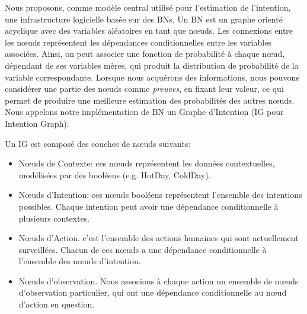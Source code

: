 \documentclass[a4paper,11pt,twoside]{StyleThese}
\begin{document}
Nous proposons, comme modèle central utilisé pour l'estimation de l'intention, une infrastructure logicielle basée sur des BNs. Un BN est un graphe orienté acyclique avec des variables aléatoires en tant que nœuds. Les connexions entre les nœuds représentent les dépendances conditionnelles entre les variables associées. Ainsi, on peut associer une fonction de probabilité à chaque nœud, dépendant de ses variables mères, qui produit la distribution de probabilité de la variable correspondante. Lorsque nous acquérons des informations, nous pouvons considérer une partie des nœuds comme \textit{preuves}, en fixant leur valeur, ce qui permet de produire une meilleure estimation des probabilités des autres nœuds. Nous appelons notre implémentation de BN un Graphe d'Intention (IG pour Intention Graph).


Un IG est composé des couches de nœuds suivants:
\begin{itemize}
\item Nœuds de Contexte: ces nœuds représentent les données contextuelles, modélisées par des booléens (e.g. HotDay, ColdDay).
\item Nœuds d'Intention: ces nœuds booléens représentent l'ensemble des intentions possibles. Chaque intention peut avoir une dépendance conditionnelle à plusieurs contextes.
\item Nœuds d'Action. c'est l'ensemble des actions humaines qui sont actuellement surveillées. Chacun de ces nœuds a une dépendance conditionnelle à l'ensemble des nœuds d'intention.
\item Nœuds d'observation. Nous associons à chaque action un ensemble de nœuds d'observation particulier, qui ont une dépendance conditionnelle au nœud d'action en question. 
\end{itemize}
\end{document}
